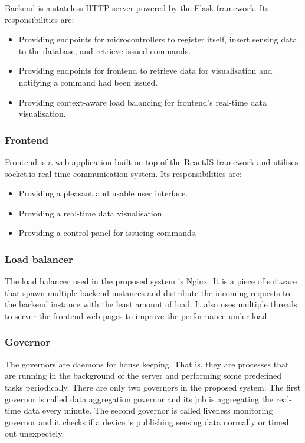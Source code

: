 \documentclass[../thesis.tex]{subfiles}
\begin{document}
Backend is a stateless HTTP server powered by the Flask framework. Its responsibilities are:

\begin{itemize}
	\item Providing endpoints for microcontrollers to register itself, insert sensing data to the database, and retrieve issued commands.
	\item Providing endpoints for frontend to retrieve data for visualisation and notifying a command had been issued.
	\item Providing context-aware load balancing for frontend's real-time data visualisation. 
\end{itemize}

\subsubsection{Frontend}

Frontend is a web application built on top of the ReactJS framework and utilises socket.io real-time communication system. Its responsibilities are: 

\begin{itemize}
	\item Providing a pleasant and usable user interface.
	\item Providing a real-time data visualisation.
	\item Providing a control panel for issueing commands.
\end{itemize}

\subsubsection{Load balancer}

The load balancer used in the proposed system is Nginx. It is a piece of software that spawn multiple backend instances and distribute the incoming requests to the backend instance with the least amount of load. It also uses multiple threads to server the frontend web pages to improve the performance under load.

\subsubsection{Governor}

The governors are daemons for house keeping. That is, they are processes that are running in the background of the server and performing some predefined tasks periodically. There are only two governors in the proposed system. The first governor is called data aggregation governor and its job is aggregating the real-time data every minute. The second governor is called liveness monitoring governor and it checks if a device is publishing sensing data normally or timed out unexpectely. 
\end{document}

